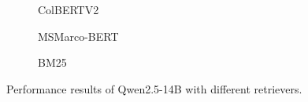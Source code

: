 \begin{figure}
\centering

\begin{subfigure}[b]{1.0\textwidth}
    
    \vspace{-1.0em}
    \caption{\scriptsize ColBERTV2}\label{fig:scores_colbert_qwen}
\end{subfigure}

\vspace{1.0em}

\begin{subfigure}[b]{0.49\textwidth}
    
    \caption{\scriptsize MSMarco-BERT}\label{fig:scores_dense_qwen}
\end{subfigure}
\begin{subfigure}[b]{0.49\textwidth}
    
    \caption{\scriptsize BM25}\label{fig:scores_bm25_qwen}
\end{subfigure}

\caption{Performance results of Qwen2.5-14B with different retrievers.}
\label{fig:scores_qwen}
\end{figure}